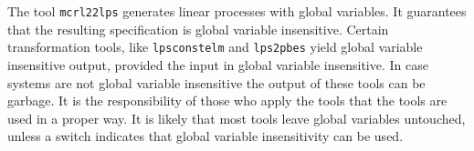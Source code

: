 \documentclass{article}
\begin{document}
The tool {\tt mcrl22lps} generates linear processes with global variables. It guarantees
that the resulting specification is global variable insensitive. Certain transformation
tools, like {\tt lpsconstelm} and {\tt lps2pbes} yield global variable insensitive output,
provided the input in global variable insensitive. In case systems are not global variable
insensitive the output of these tools can be garbage. It is the responsibility of those who
apply the tools that the tools are used in a proper way. It is likely that most tools
leave global variables untouched, unless a switch indicates that global variable
insensitivity can be used.
\end{document}

